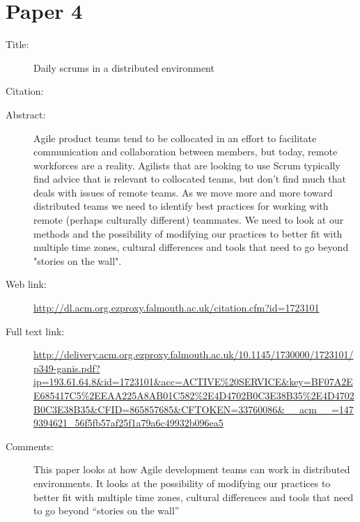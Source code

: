 \documentclass{scrartcl}
\begin{document}
\section*{Paper 4}
\begin{description}
\item[Title:] Daily scrums in a distributed environment
\item[Citation:] \cite{bibtex_key}
\item[Abstract:] Agile product teams tend to be collocated in an effort to facilitate communication and collaboration between members, but today, remote workforces are a reality. Agilists that are looking to use Scrum typically find advice that is relevant to collocated teams, but don't find much that deals with issues of remote teams. As we move more and more toward distributed teams we need to identify best practices for working with remote (perhaps culturally different) teammates. We need to look at our methods and the possibility of modifying our practices to better fit with multiple time zones, cultural differences and tools that need to go beyond "stories on the wall".
\item[Web link:] \url{http://dl.acm.org.ezproxy.falmouth.ac.uk/citation.cfm?id=1723101}
\item[Full text link:] \url{http://delivery.acm.org.ezproxy.falmouth.ac.uk/10.1145/1730000/1723101/p349-ganis.pdf?ip=193.61.64.8&id=1723101&acc=ACTIVE%20SERVICE&key=BF07A2EE685417C5%2EEAA225A8AB01C582%2E4D4702B0C3E38B35%2E4D4702B0C3E38B35&CFID=865857685&CFTOKEN=33760086&__acm__=1479394621_56f5fb57af25f1a79a6c49932b096ea5}
\item[Comments:] This paper looks at how Agile development teams can work in distributed environments. It looks at the possibility of modifying our practices to better fit with multiple time zones, cultural differences and tools that need to go beyond “stories on the wall”

\end{description}
\end{document}
